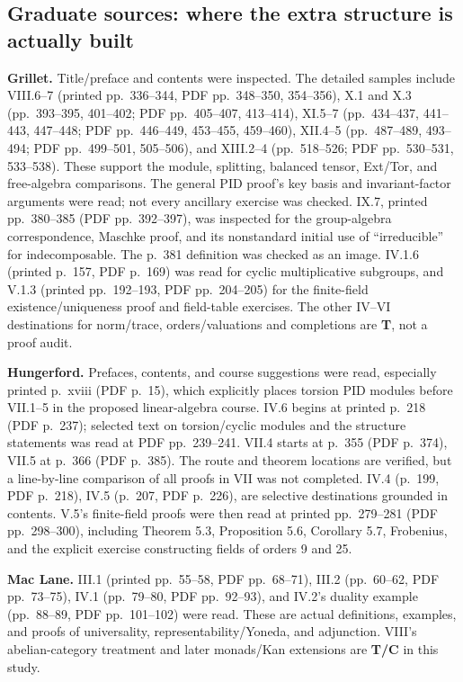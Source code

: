 \documentclass[
  11pt,
]{article}
\begin{document}
\subsection{Graduate sources: where the extra structure is actually
built}\label{graduate-sources-where-the-extra-structure-is-actually-built}

\textbf{Grillet.} Title/preface and contents were inspected. The
detailed samples include VIII.6--7 (printed pp.~336--344, PDF
pp.~348--350, 354--356), X.1 and X.3 (pp.~393--395, 401--402; PDF
pp.~405--407, 413--414), XI.5--7 (pp.~434--437, 441--443, 447--448; PDF
pp.~446--449, 453--455, 459--460), XII.4--5 (pp.~487--489, 493--494; PDF
pp.~499--501, 505--506), and XIII.2--4 (pp.~518--526; PDF pp.~530--531,
533--538). These support the module, splitting, balanced tensor,
Ext/Tor, and free-algebra comparisons. The general PID proof's key basis
and invariant-factor arguments were read; not every ancillary exercise
was checked. IX.7, printed pp.~380--385 (PDF pp.~392--397), was
inspected for the group-algebra correspondence, Maschke proof, and its
nonstandard initial use of ``irreducible'' for indecomposable. The
p.~381 definition was checked as an image. IV.1.6 (printed p.~157, PDF
p.~169) was read for cyclic multiplicative subgroups, and V.1.3 (printed
pp.~192--193, PDF pp.~204--205) for the finite-field
existence/uniqueness proof and field-table exercises. The other IV--VI
destinations for norm/trace, orders/valuations and completions are
\textbf{T}, not a proof audit.

\textbf{Hungerford.} Prefaces, contents, and course suggestions were
read, especially printed p.~xviii (PDF p.~15), which explicitly places
torsion PID modules before VII.1--5 in the proposed linear-algebra
course. IV.6 begins at printed p.~218 (PDF p.~237); selected text on
torsion/cyclic modules and the structure statements was read at PDF
pp.~239--241. VII.4 starts at p.~355 (PDF p.~374), VII.5 at p.~366 (PDF
p.~385). The route and theorem locations are verified, but a
line-by-line comparison of all proofs in VII was not completed. IV.4
(p.~199, PDF p.~218), IV.5 (p.~207, PDF p.~226), are selective
destinations grounded in contents. V.5's finite-field proofs were then
read at printed pp.~279--281 (PDF pp.~298--300), including Theorem 5.3,
Proposition 5.6, Corollary 5.7, Frobenius, and the explicit exercise
constructing fields of orders 9 and 25.

\textbf{Mac Lane.} III.1 (printed pp.~55--58, PDF pp.~68--71), III.2
(pp.~60--62, PDF pp.~73--75), IV.1 (pp.~79--80, PDF pp.~92--93), and
IV.2's duality example (pp.~88--89, PDF pp.~101--102) were read. These
are actual definitions, examples, and proofs of universality,
representability/Yoneda, and adjunction. VIII's abelian-category
treatment and later monads/Kan extensions are \textbf{T/C} in this
study.
\end{document}
